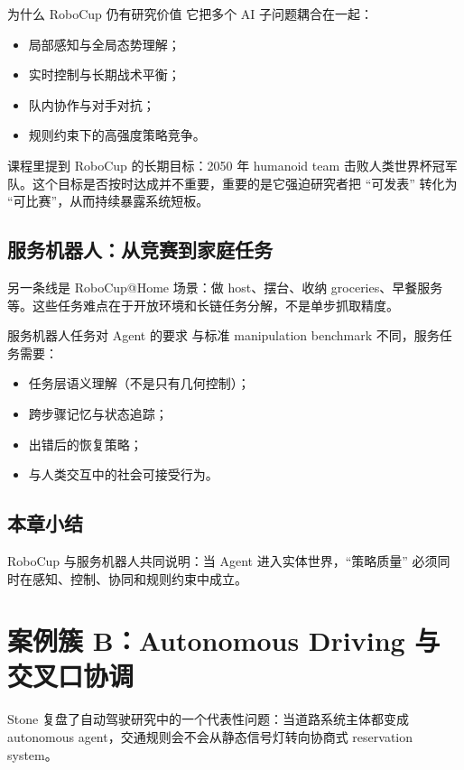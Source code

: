 \documentclass[a4paper]{article}
\begin{document}
\begin{knowledgebox}{为什么 RoboCup 仍有研究价值}
它把多个 AI 子问题耦合在一起：
\begin{itemize}
    \item 局部感知与全局态势理解；
    \item 实时控制与长期战术平衡；
    \item 队内协作与对手对抗；
    \item 规则约束下的高强度策略竞争。
\end{itemize}
\end{knowledgebox}

课程里提到 RoboCup 的长期目标：2050 年 humanoid team 击败人类世界杯冠军队。这个目标是否按时达成并不重要，重要的是它强迫研究者把 ``可发表'' 转化为 ``可比赛''，从而持续暴露系统短板。

\subsection{服务机器人：从竞赛到家庭任务}
另一条线是 RoboCup@Home 场景：做 host、摆台、收纳 groceries、早餐服务等。这些任务难点在于开放环境和长链任务分解，不是单步抓取精度。

\begin{importantbox}{服务机器人任务对 Agent 的要求}
与标准 manipulation benchmark 不同，服务任务需要：
\begin{itemize}
    \item 任务层语义理解（不是只有几何控制）；
    \item 跨步骤记忆与状态追踪；
    \item 出错后的恢复策略；
    \item 与人类交互中的社会可接受行为。
\end{itemize}
\end{importantbox}

\subsection{本章小结}
RoboCup 与服务机器人共同说明：当 Agent 进入实体世界，``策略质量'' 必须同时在感知、控制、协同和规则约束中成立。

\section{案例簇 B：Autonomous Driving 与交叉口协调}

Stone 复盘了自动驾驶研究中的一个代表性问题：当道路系统主体都变成 autonomous agent，交通规则会不会从静态信号灯转向协商式 reservation system。
\end{document}
